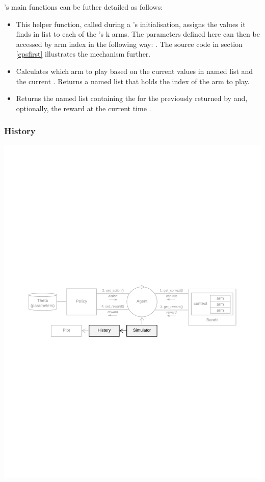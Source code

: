\documentclass{jss}
\begin{document}
's main functions can be futher detailed as follows:

\begin{itemize}

\item{}{
 This helper function, called during a 's initialisation, assigns the values
 it finds in list  to each of the 's k arms.
 The parameters defined here can then be accessed by arm index in the following way:
 . The source code in section \ref{epsfirst}
 illustrates the mechanism further.
}

\item{}{
 Calculates which arm to play based on the current values in named list 
 and the current . Returns a named list
  that holds the index of the arm
 to play.
}

\item{}{
 Returns the named list
  containing the 
 for the  previously returned by  and, optionally, the  reward
 at the current time .
 }
\end{itemize}

\subsubsection{History}

\includegraphics[width=\textwidth]{fig/all_cmab_phases_Part7}
\end{document}

